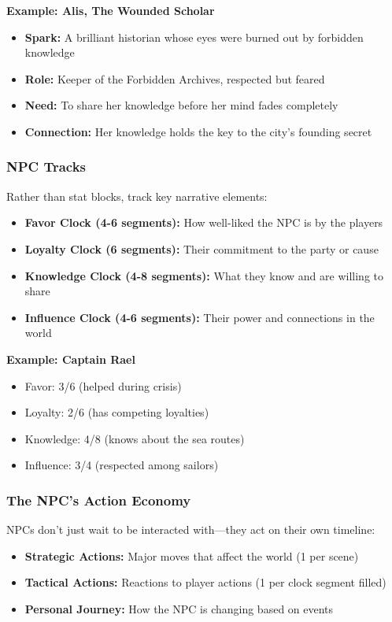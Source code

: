 \textbf{Example: Alis, The Wounded Scholar}
\begin{itemize}
  \item \textbf{Spark:} A brilliant historian whose eyes were burned out by forbidden knowledge
  \item \textbf{Role:} Keeper of the Forbidden Archives, respected but feared
  \item \textbf{Need:} To share her knowledge before her mind fades completely
  \item \textbf{Connection:} Her knowledge holds the key to the city's founding secret
\end{itemize}

\subsubsection{NPC Tracks}

Rather than stat blocks, track key narrative elements:

\begin{itemize}
  \item \textbf{Favor Clock (4-6 segments):} How well-liked the NPC is by the players
  \item \textbf{Loyalty Clock (6 segments):} Their commitment to the party or cause
  \item \textbf{Knowledge Clock (4-8 segments):} What they know and are willing to share
  \item \textbf{Influence Clock (4-6 segments):} Their power and connections in the world
\end{itemize}

\textbf{Example: Captain Rael}
\begin{itemize}
  \item Favor: 3/6 (helped during crisis)
  \item Loyalty: 2/6 (has competing loyalties)
  \item Knowledge: 4/8 (knows about the sea routes)
  \item Influence: 3/4 (respected among sailors)
\end{itemize}

\subsubsection{The NPC's Action Economy}

NPCs don't just wait to be interacted with---they act on their own timeline:

\begin{itemize}
  \item \textbf{Strategic Actions:} Major moves that affect the world (1 per scene)
  \item \textbf{Tactical Actions:} Reactions to player actions (1 per clock segment filled)
  \item \textbf{Personal Journey:} How the NPC is changing based on events
\end{itemize}

